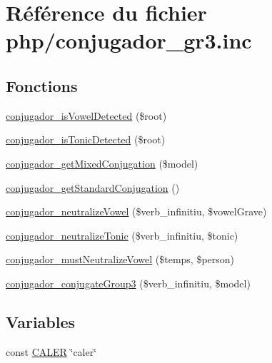 \hypertarget{php_2conjugador__gr3_8inc}{}\section{Référence du fichier php/conjugador\+\_\+gr3.inc}
\label{php_2conjugador__gr3_8inc}
\subsection*{Fonctions}
\begin{DoxyCompactItemize}
\item 
\hyperlink{php_2conjugador__gr3_8inc_a688122e728649856c4dede0a1c1fabb5}{conjugador\+\_\+is\+Vowel\+Detected} (\$root)
\item 
\hyperlink{php_2conjugador__gr3_8inc_a3920febe59bd11cb42cd71eb1ecc1877}{conjugador\+\_\+is\+Tonic\+Detected} (\$root)
\item 
\hyperlink{php_2conjugador__gr3_8inc_a63f5a06816fc5ba96efef90d519a22c4}{conjugador\+\_\+get\+Mixed\+Conjugation} (\$model)
\item 
\hyperlink{php_2conjugador__gr3_8inc_ae0396ebccfe3276e0babfb92c143ddcd}{conjugador\+\_\+get\+Standard\+Conjugation} ()
\item 
\hyperlink{php_2conjugador__gr3_8inc_ab7dc6b4f2a809a04cbe98e6885a895dc}{conjugador\+\_\+neutralize\+Vowel} (\$verb\+\_\+infinitiu, \$vowel\+Grave)
\item 
\hyperlink{php_2conjugador__gr3_8inc_a947ef6897639f09bfec229c106a1baa3}{conjugador\+\_\+neutralize\+Tonic} (\$verb\+\_\+infinitiu, \$tonic)
\item 
\hyperlink{php_2conjugador__gr3_8inc_a1cfc9cf5cbbb005b55985d39ed2201c4}{conjugador\+\_\+must\+Neutralize\+Vowel} (\$temps, \$person)
\item 
\hyperlink{php_2conjugador__gr3_8inc_ae22fa28537be9bd6c1e05a97931bcc6d}{conjugador\+\_\+conjugate\+Group3} (\$verb\+\_\+infinitiu, \$model)
\end{DoxyCompactItemize}
\subsection*{Variables}
\begin{DoxyCompactItemize}
\item 
const \hyperlink{php_2conjugador__gr3_8inc_afb7f357610ed4add7b75ee405fc8c69c}{C\+A\+L\+ER} \char`\"{}caler\char`\"{}
\end{DoxyCompactItemize}


